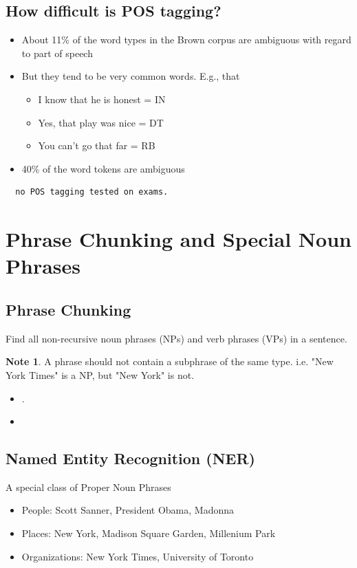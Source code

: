 \documentclass[11pt]{article}
\theoremstyle{definition}
\newtheorem{note}{Note}
\begin{document}
\subsection{How difficult is POS tagging?}
\begin{itemize}
  \item About 11\% of the word types in the Brown corpus are
  ambiguous with regard to part of speech
  \item But they tend to be very common words. E.g., that
  \begin{itemize}
    \item I know that he is honest = IN
    \item Yes, that play was nice = DT
    \item You can’t go that far = RB
  \end{itemize}
  \item 40\% of the word tokens are ambiguous
\end{itemize}

\begin{verbatim}
  no POS tagging tested on exams.
\end{verbatim}

\section{Phrase Chunking and
Special Noun Phrases}

\subsection{Phrase Chunking}
Find all non-recursive noun phrases (NPs) and verb
phrases (VPs) in a sentence.

\begin{note}
  A phrase should not contain a subphrase of the same type.
  i.e. "New York Times" is a NP, but "New York" is not.
\end{note}

\begin{itemize}
  \item [] [NP I] [VP ate] [NP the spaghetti] [PP with] [NP meatballs].
  \item [] [NP He] [VP reckons] [NP the current account deficit] [VP will
  narrow] [PP to] [NP only \# 1.8 billion] [PP in] [NP September]
\end{itemize}

\subsection{Named Entity Recognition (NER)}
A special class of Proper Noun Phrases
\begin{itemize}
  \item People: Scott Sanner, President Obama, Madonna
  \item Places: New York, Madison Square Garden, Millenium Park
  \item Organizations: New York Times, University of Toronto
\end{itemize}
\end{document}
